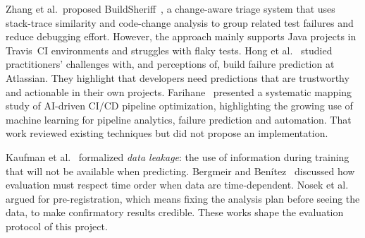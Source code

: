 Zhang et al.\ proposed BuildSheriff~\cite{zhang2022buildsheriff}, a change-aware triage system that uses stack-trace similarity and code-change analysis to group related test failures and reduce debugging effort. However, the approach mainly supports Java projects in Travis~CI environments and struggles with flaky tests. Hong et al.~\cite{hong2024practitioners} studied practitioners' challenges with, and perceptions of, build failure prediction at Atlassian. They highlight that developers need predictions that are trustworthy and actionable in their own projects. Farihane~\cite{farihane2025ci} presented a systematic mapping study of AI-driven CI/CD pipeline optimization, highlighting the growing use of machine learning for pipeline analytics, failure prediction and automation. That work reviewed existing techniques but did not propose an implementation.

Kaufman et al.~\cite{kaufman2012leakage} formalized \emph{data leakage}: the use of information during training that will not be available when predicting. Bergmeir and Benítez~\cite{bergmeir2012use} discussed how evaluation must respect time order when data are time-dependent. Nosek et al.~\cite{nosek2018preregistration} argued for pre-registration, which means fixing the analysis plan before seeing the data, to make confirmatory results credible. These works shape the evaluation protocol of this project.

